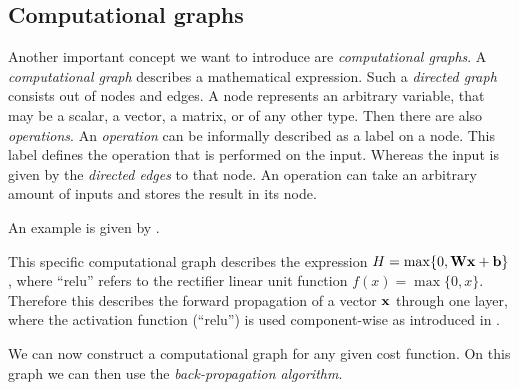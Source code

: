 \subsection{Computational graphs}
\label{sec:computational-graphs}

Another important concept we want to introduce are \emph{computational graphs}.
A \emph{computational graph} describes a mathematical expression.
Such a \emph{directed graph} consists out of nodes and edges.
A node represents an arbitrary variable, that may be a scalar, a vector, a matrix, or of any other type.
Then there are also \emph{operations}.
An \emph{operation} can be informally described as a label on a node.
This label defines the operation that is performed on the input.
Whereas the input is given by the \emph{directed edges} to that node.
An operation can take an arbitrary amount of inputs and stores the result in its node.

An example is given by .


This specific computational graph describes the expression \(H = \max\{0, \mathbf{W}\mathbf{x} + \mathbf{b}\}\), 
where \enquote{relu} refers to the rectifier linear unit function \(f(x) = \max\{0, x\}\).
Therefore this describes the forward propagation of a vector \(\mathbf{x}\) through one layer, where the activation function (\enquote{relu}) is used component-wise as introduced in .

We can now construct a computational graph for any given cost function.
On this graph we can then use the \emph{back-propagation algorithm}.